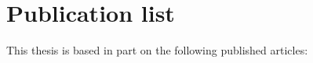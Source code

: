 %
\chapter{Publication list}
\begin{bibunit}[utphysLSB]
\newcommand{\hiliteLSB}[1]{#1}
\begin{singlespace}
This thesis is based in part on the following published articles:
\nocite{bishop_nonlinear_2009, chow_2009, bishop_proposal_2009, dicarlo_demonstration_2009}

\renewcommand{\bibsection}{\relax} %
\end{singlespace}
\end{bibunit}
